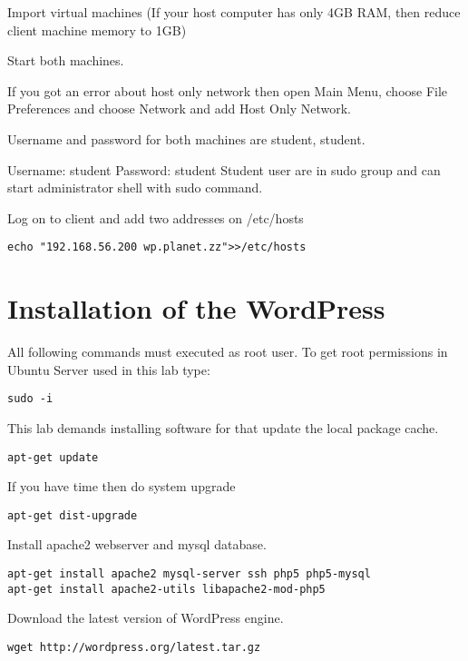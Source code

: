Import virtual machines (If your host computer has only 4GB RAM, then reduce client machine memory to 1GB)

Start both machines. 

{\small{If you got an error about host only network then open Main Menu, choose File Preferences and choose Network and add Host Only Network.}}

Username and password for both machines are student, student.

Username: student
Password: student
Student user are in sudo group and can start administrator shell with sudo command.

Log on to client and add two addresses on /etc/hosts
\begin{verbatim}
echo "192.168.56.200 wp.planet.zz">>/etc/hosts
\end{verbatim}

\section{Installation of the WordPress}
All following commands must executed as root user. To get root permissions in Ubuntu Server used in this lab type:


\begin{verbatim}
sudo -i
\end{verbatim}



This lab demands installing software for that update the local package cache.


\begin{verbatim}
apt-get update
\end{verbatim}

If you have time then do system upgrade
\begin{verbatim}
apt-get dist-upgrade
\end{verbatim}

Install apache2 webserver and mysql database.
\begin{verbatim}
apt-get install apache2 mysql-server ssh php5 php5-mysql 
apt-get install apache2-utils libapache2-mod-php5
\end{verbatim}

Download the latest version of WordPress engine.
\begin{verbatim}
wget http://wordpress.org/latest.tar.gz
\end{verbatim}

